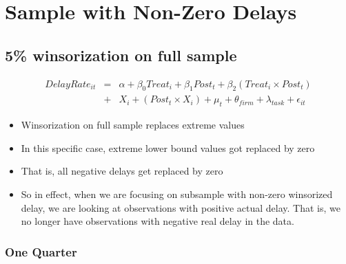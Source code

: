 \documentclass[
]{article}
\providecommand{\tightlist}{%
  \setlength{\itemsep}{0pt}\setlength{\parskip}{0pt}}
\begin{document}
\hypertarget{sample-with-non-zero-delays}{%
\section{Sample with Non-Zero
Delays}\label{sample-with-non-zero-delays}}

\hypertarget{winsorization-on-full-sample}{%
\subsection{5\% winsorization on full
sample}\label{winsorization-on-full-sample}}

\[ \begin{aligned} DelayRate_{it} &=& \alpha+\beta_0 Treat_i + \beta_1 Post_t + \beta_2 (Treat_i \times Post_t)\\
&+&  X_i + (Post_t \times X_i) + \mu_t + \theta_{firm} + \lambda_{task}+ \epsilon_{it}
\end{aligned}\]

\begin{itemize}
\tightlist
\item
  Winsorization on full sample replaces extreme values
\item
  In this specific case, extreme lower bound values got replaced by zero
\item
  That is, all negative delays get replaced by zero
\item
  So in effect, when we are focusing on subsample with non-zero
  winsorized delay, we are looking at observations with positive actual
  delay. That is, we no longer have observations with negative real
  delay in the data.
\end{itemize}

\hypertarget{one-quarter-3}{%
\subsubsection{One Quarter}\label{one-quarter-3}}
\end{document}
